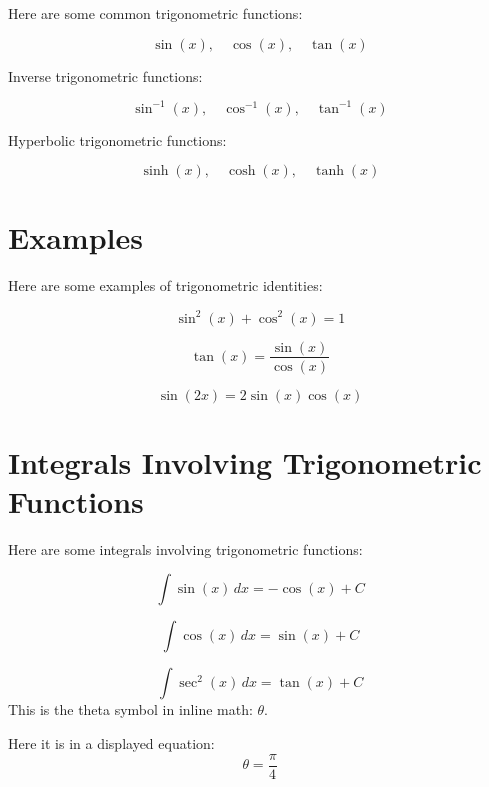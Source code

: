 \documentclass{article}
\begin{document}
Here are some common trigonometric functions:

\[
\sin(x), \quad \cos(x), \quad \tan(x)
\]

Inverse trigonometric functions:

\[
\sin^{-1}(x), \quad \cos^{-1}(x), \quad \tan^{-1}(x)
\]

Hyperbolic trigonometric functions:

\[
\sinh(x), \quad \cosh(x), \quad \tanh(x)
\]

\section{Examples}

Here are some examples of trigonometric identities:

\[
\sin^2(x) + \cos^2(x) = 1
\]

\[
\tan(x) = \frac{\sin(x)}{\cos(x)}
\]

\[
\sin(2x) = 2 \sin(x) \cos(x)
\]

\section{Integrals Involving Trigonometric Functions}

Here are some integrals involving trigonometric functions:

\[
\int \sin(x) \, dx = -\cos(x) + C
\]

\[
\int \cos(x) \, dx = \sin(x) + C
\]

\[
\int \sec^2(x) \, dx = \tan(x) + C
\]
This is the theta symbol in inline math: $\theta$.

Here it is in a displayed equation:
\[
\theta = \frac{\pi}{4}
\]
\end{document}

